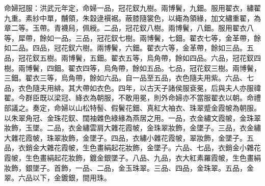 命婦冠服：洪武元年定，命婦一品，冠花釵九樹。兩博鬢，九鈿。服用翟衣，繡翟九重。素紗中單，黼領，朱縠逯襈裾。蔽膝隨裳色，以緅為領緣，加文繡重翟，為章二等。玉帶。青襪舄，佩綬。二品，冠花釵八樹。兩博鬢，八鈿。服用翟衣八等，犀帶，餘如一品。三品，冠花釵七樹。兩博鬢，七鈿。翟衣七等，金革帶，餘如二品。四品，冠花釵六樹。兩博鬢，六鈿。翟衣六等，金革帶，餘如三品。五品，冠花釵五樹。兩博鬢，五鈿。翟衣五等，烏角帶，餘如四品。六品，冠花釵四樹。兩博鬢，四鈿。翟衣四等，烏角帶，餘如五品。七品，冠花釵三樹。兩博鬢，三鈿。翟衣三等，烏角帶，餘如六品。自一品至五品，衣色隨夫用紫。六品、七品，衣色隨夫用緋。其大帶如衣色。四年，以古天子諸侯服袞冕，后與夫人亦服禕翟。今群臣既以梁冠、絳衣為朝服，不敢用冕，則外命婦亦不當服翟衣以朝。命禮部議之。奏定，命婦以山松特髻、假鬢花鈿、真紅大袖衣、珠翠蹙金霞帔為朝服。以朱翠角冠、金珠花釵、闊袖雜色綠緣為燕居之用。一品，衣金繡文霞帔，金珠翠妝飾，玉墜。二品，衣金繡雲肩大雜花霞帔，金珠翠妝飾，金墜子。三品，衣金繡大雜花霞帔，珠翠妝飾，金墜子。四品，衣繡小雜花霞帔，翠妝飾，金墜子。五品，衣銷金大雜花霞帔，生色畫絹起花妝飾，金墜子。六品、七品，衣銷金小雜花霞帔，生色畫絹起花妝飾，鍍金銀墜子。八品、九品，衣大紅素羅霞帔，生色畫絹妝飾，銀墜子。首飾，一品、二品，金玉珠翠。三品、四品，金珠翠。五品，金翠。六品以下，金鍍銀，間用珠。

